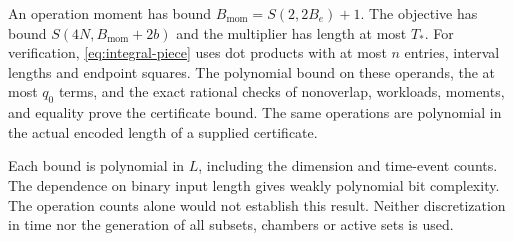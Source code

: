An operation moment has bound $B_{\mathrm{mom}}=S(2,2B_e)+1$. The objective has bound $S(4N,B_{\mathrm{mom}}+2b)$ and the multiplier has length at most $T_*$. For verification, \eqref{eq:integral-piece} uses dot products with at most $n$ entries, interval lengths and endpoint squares. The polynomial bound on these operands, the at most $q_0$ terms, and the exact rational checks of nonoverlap, workloads, moments, and equality prove the certificate bound. The same operations are polynomial in the actual encoded length of a supplied certificate.

Each bound is polynomial in $L$, including the dimension and time-event counts. The dependence on binary input length gives weakly polynomial bit complexity. The operation counts alone would not establish this result. Neither discretization in time nor the generation of all subsets, chambers or active sets is used.
